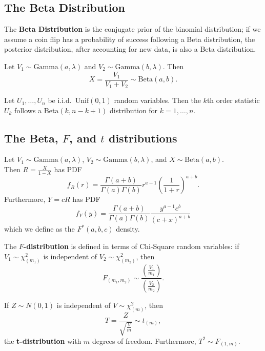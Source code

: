 \begin{enumerate}[a)]
    \subsection{The Beta Distribution}

    \begin{definition}
    The \textbf{Beta Distribution} is the conjugate prior of the binomial distribution; if we assume a coin flip has a probability of success following a
    Beta distribution, the posterior distribution, after accounting for new data, is also a Beta distribution.
    \end{definition}

    \begin{remark}
    Let $V_1 \sim \mathrm{Gamma}(a, \lambda)$ and $V_2 \sim \mathrm{Gamma}(b, \lambda)$. Then
    \[
        X = \frac{V_1}{V_1 + V_2} \sim \mathrm{Beta}(a, b). 
    \]
    \end{remark}

    \begin{remark}
    Let $U_1, \dots, U_n$ be i.i.d.\ $\mathrm{Unif}(0, 1)$ random variables. Then the $k$th order statistic $U_k$ follows a $\mathrm{Beta}(k, n-k + 1)$ distribution for $k = 1, \dots , n$.   
    \end{remark}

    \subsection{The Beta, $F$, and $t$ distributions}
    \begin{remark}
    Let $V_1 \sim \mathrm{Gamma}(a, \lambda)$, $V_2 \sim \mathrm{Gamma}(b, \lambda)$, and $X \sim \mathrm{Beta}(a, b)$. \\
    
    Then $R = \frac{X}{1-X}$ has PDF
    \[
        f_R(r) = \frac{\Gamma(a + b)}{\Gamma(a)\Gamma(b)} r^{a-1} \left( \frac{1}{1+r} \right)^{a+b}.  
    \]
    Furthermore, $Y = cR$ has PDF
    \[
        f_Y(y) = \frac{\Gamma(a + b)}{\Gamma(a)\Gamma(b)} \frac{y^{a-1} c^b}{(c+x)^{a+b}} 
    \]
    which we define as the $F^* (a, b, c)$ density.
    
    \end{remark}

    \begin{definition}
    The \textbf{$F$-distribution} is defined in terms of Chi-Square random variables: if $V_1 \sim \chi_(m_1)^2$ is independent of  $V_2 \sim \chi_(m_2)^2$, then
    \[
        F_{(m_1, m_2)} \sim \frac{\left( \frac{V_1}{m_1} \right) }{\left( \frac{V_2}{m_2} \right)}.
    \]
    \end{definition}

    \begin{definition}
    If $Z \sim N(0, 1)$ is independent of $V \sim \chi_{(m)}^2$, then 
    \[
        T = \frac{Z}{\sqrt{\frac{V}{m}} } \sim t_(m),
    \]
    the \textbf{t-distribution} with $m$ degrees of freedom. Furthermore, $T^2 \sim F_{(1, m)}$. 
    \end{definition}

\end{enumerate}
